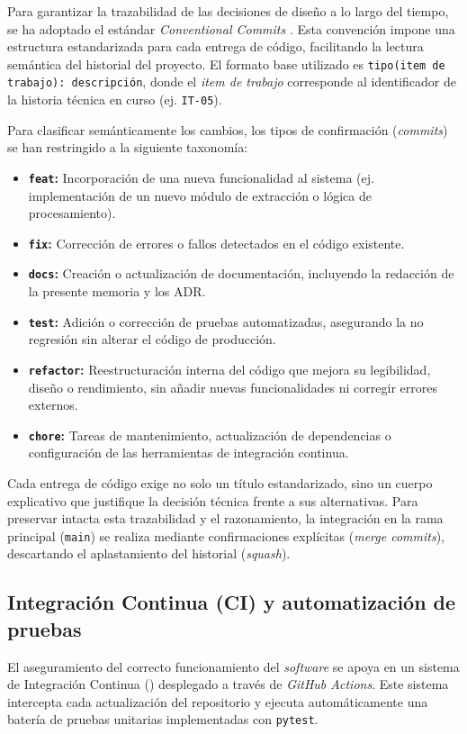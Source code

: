 Para garantizar la trazabilidad de las decisiones de diseño a lo largo del tiempo, se ha adoptado el estándar \textit{Conventional Commits} \cite{conventionalcommits}. Esta convención impone una estructura estandarizada para cada entrega de código, facilitando la lectura semántica del historial del proyecto. El formato base utilizado es \texttt{tipo(item de trabajo): descripción}, donde el \textit{item de trabajo} corresponde al identificador de la historia técnica en curso (ej. \texttt{IT-05}).

Para clasificar semánticamente los cambios, los tipos de confirmación (\textit{commits}) se han restringido a la siguiente taxonomía:
\begin{itemize}                                                                                                                                                    
  \item \textbf{\texttt{feat}:} Incorporación de una nueva funcionalidad al sistema (ej. implementación de un nuevo módulo de extracción o lógica de procesamiento).
  \item \textbf{\texttt{fix}:} Corrección de errores o fallos detectados en el código existente.
  \item \textbf{\texttt{docs}:} Creación o actualización de documentación, incluyendo la redacción de la presente memoria y los ADR.
  \item \textbf{\texttt{test}:} Adición o corrección de pruebas automatizadas, asegurando la no regresión sin alterar el código de producción.
  \item \textbf{\texttt{refactor}:} Reestructuración interna del código que mejora su legibilidad, diseño o rendimiento, sin añadir nuevas funcionalidades ni corregir errores externos.
  \item \textbf{\texttt{chore}:} Tareas de mantenimiento, actualización de dependencias o configuración de las herramientas de integración continua.
\end{itemize}

Cada entrega de código exige no solo un título estandarizado, sino un cuerpo explicativo que justifique la decisión técnica frente a sus alternativas. Para preservar intacta esta trazabilidad y el razonamiento, la integración en la rama principal (\texttt{main}) se realiza mediante confirmaciones explícitas (\textit{merge commits}), descartando el aplastamiento del historial (\textit{squash}).

\subsection{Integración Continua (CI) y automatización de pruebas}
\label{secc:Integracion_continua}
El aseguramiento del correcto funcionamiento del \textit{software} se apoya en un sistema de Integración Continua () desplegado a través de \textit{GitHub Actions}. Este sistema intercepta cada actualización del repositorio y ejecuta automáticamente una batería de pruebas unitarias implementadas con \texttt{pytest}\cite{pytest}.

